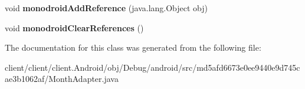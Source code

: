 \begin{DoxyCompactItemize}
\item 
\hypertarget{classmd5afd6673e0ee9440e9d745cae3b1062af_1_1MonthAdapter_a2bc15b4fe7fe90e98450493c3aa22731}{}void {\bfseries monodroid\+Add\+Reference} (java.\+lang.\+Object obj)\label{classmd5afd6673e0ee9440e9d745cae3b1062af_1_1MonthAdapter_a2bc15b4fe7fe90e98450493c3aa22731}

\item 
\hypertarget{classmd5afd6673e0ee9440e9d745cae3b1062af_1_1MonthAdapter_add9d24477f399fe957d0178461e3b6f8}{}void {\bfseries monodroid\+Clear\+References} ()\label{classmd5afd6673e0ee9440e9d745cae3b1062af_1_1MonthAdapter_add9d24477f399fe957d0178461e3b6f8}

\end{DoxyCompactItemize}


The documentation for this class was generated from the following file\+:\begin{DoxyCompactItemize}
\item 
client/client/client.\+Android/obj/\+Debug/android/src/md5afd6673e0ee9440e9d745cae3b1062af/Month\+Adapter.\+java\end{DoxyCompactItemize}
